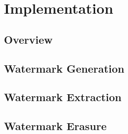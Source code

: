 \chapter{Implementation}

\section{Overview}


\section{Watermark Generation}


\section{Watermark Extraction}


\section{Watermark Erasure}

